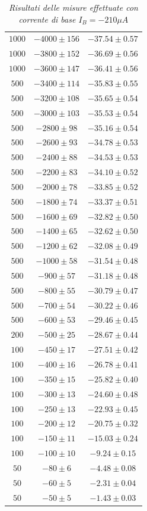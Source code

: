 \documentclass{article}
\begin{document}
\begin{table}[]
{\begin{tabular}{|c|c|c|}
$1000$ & $-4000\pm{156}$ & $-37.54\pm{0.57}$ \\
$1000$ & $-3800\pm{152}$ & $-36.69\pm{0.56}$ \\
$1000$ & $-3600\pm{147}$ & $-36.41\pm{0.56}$ \\
$500$ & $-3400\pm{114}$ & $-35.83\pm{0.55}$ \\
$500$ & $-3200\pm{108}$ & $-35.65\pm{0.54}$ \\
$500$ & $-3000\pm{103}$ & $-35.53\pm{0.54}$ \\
$500$ & $-2800\pm{98}$ & $-35.16\pm{0.54}$ \\
$500$ & $-2600\pm{93}$ & $-34.78\pm{0.53}$ \\
$500$ & $-2400\pm{88}$ & $-34.53\pm{0.53}$ \\
$500$ & $-2200\pm{83}$ & $-34.10\pm{0.52}$ \\
$500$ & $-2000\pm{78}$ & $-33.85\pm{0.52}$ \\
$500$ & $-1800\pm{74}$ & $-33.37\pm{0.51}$ \\
$500$ & $-1600\pm{69}$ & $-32.82\pm{0.50}$ \\
$500$ & $-1400\pm{65}$ & $-32.62\pm{0.50}$ \\
$500$ & $-1200\pm{62}$ & $-32.08\pm{0.49}$ \\
$500$ & $-1000\pm{58}$ & $-31.54\pm{0.48}$ \\
$500$ & $-900\pm{57}$ & $-31.18\pm{0.48}$ \\
$500$ & $-800\pm{55}$ & $-30.79\pm{0.47}$ \\
$500$ & $-700\pm{54}$ & $-30.22\pm{0.46}$ \\
$500$ & $-600\pm{53}$ & $-29.46\pm{0.45}$ \\
$200$ & $-500\pm{25}$ & $-28.67\pm{0.44}$ \\
$100$ & $-450\pm{17}$ & $-27.51\pm{0.42}$ \\
$100$ & $-400\pm{16}$ & $-26.78\pm{0.41}$ \\
$100$ & $-350\pm{15}$ & $-25.82\pm{0.40}$ \\
$100$ & $-300\pm{13}$ & $-24.60\pm{0.48}$ \\
$100$ & $-250\pm{13}$ & $-22.93\pm{0.45}$ \\
$100$ & $-200\pm{12}$ & $-20.75\pm{0.32}$ \\
$100$ & $-150\pm{11}$ & $-15.03\pm{0.24}$ \\
$100$ & $-100\pm{10}$ & $-9.24\pm{0.15}$ \\
$50$ & $-80\pm{6}$ & $-4.48\pm{0.08}$ \\
$50$ & $-60\pm{5}$ & $-2.31\pm{0.04}$ \\
$50$ & $-50\pm{5}$ & $-1.43\pm{0.03}$ \\

\hline
\end{tabular}
 }
 \caption{\textit{Risultati delle misure effettuate con corrente di base $I_B=-210\mu A$}}
\end{table}
\end{document}
